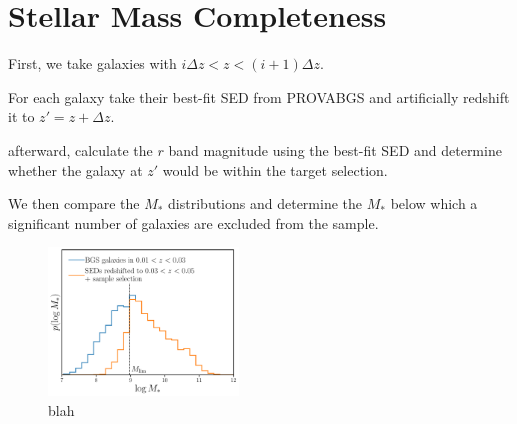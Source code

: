 \section{Stellar Mass Completeness} \label{sec:mscomp}

First, we take galaxies with $i \Delta z < z < (i+1) \Delta z$. 

For each galaxy take their best-fit SED from {\sc PROVABGS} and artificially redshift it to 
$z' = z + \Delta z$.

afterward, calculate the $r$ band magnitude using the best-fit SED and
determine whether the galaxy at $z'$ would be within the target selection. 


We then compare the $M_*$ distributions and determine the $M_*$ below which  a
significant number of galaxies are excluded from the sample.  


\begin{figure}
\begin{center}
    \includegraphics[width=0.45\textwidth]{figs/psmf_logMstar_comp_demo.pdf}
    \caption{blah
    }\label{fig:ms_comp0}
\end{center}
\end{figure}


